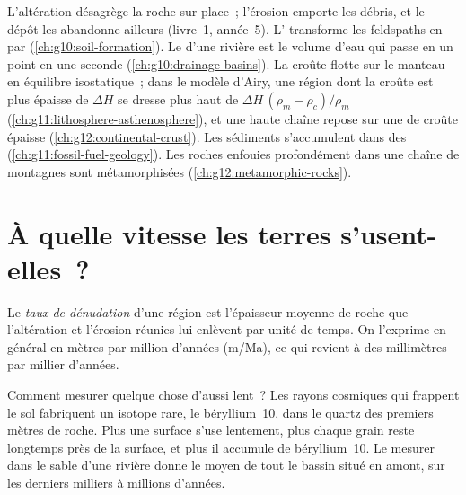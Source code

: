 \begin{recall}
L'altération désagrège la roche sur place~; l'érosion emporte les débris,
et le dépôt les abandonne ailleurs (livre~1, année~5). L' transforme les feldspaths en  par 
(\cref{ch:g10:soil-formation}). Le  d'une rivière est le volume d'eau
qui passe en un point en une seconde (\cref{ch:g10:drainage-basins}). La
croûte flotte sur le manteau en équilibre isostatique~; dans le modèle
d'Airy, une région dont la croûte est plus épaisse de $\Delta H$ se dresse
plus haut de $\Delta H\,(\rho_m - \rho_c)/\rho_m$
(\cref{ch:g11:lithosphere-asthenosphere}), et une haute chaîne repose sur
une  de croûte épaisse (\cref{ch:g12:continental-crust}). Les
sédiments s'accumulent dans des 
(\cref{ch:g11:fossil-fuel-geology}). Les roches enfouies profondément dans
une chaîne de montagnes sont métamorphisées
(\cref{ch:g12:metamorphic-rocks}).
\end{recall}

\section{À quelle vitesse les terres s'usent-elles~?}

\begin{definition}\label{def:g12:destruction-of-mountains:denudation}
Le \emph{taux de dénudation}
d'une région est l'épaisseur moyenne de roche que l'altération et l'érosion
réunies lui enlèvent par unité de temps. On l'exprime en général en mètres
par million d'années (\unit{m/Ma}), ce qui revient à des millimètres par
millier d'années.
\end{definition}

Comment mesurer quelque chose d'aussi lent~? Les rayons cosmiques qui
frappent le sol fabriquent un isotope rare, le béryllium~10, dans le quartz
des premiers mètres de roche. Plus une surface s'use lentement, plus chaque
grain reste longtemps près de la surface, et plus il accumule de
béryllium~10. Le mesurer dans le sable d'une rivière donne le  moyen de tout le bassin situé en amont, sur les derniers
milliers à millions d'années.

